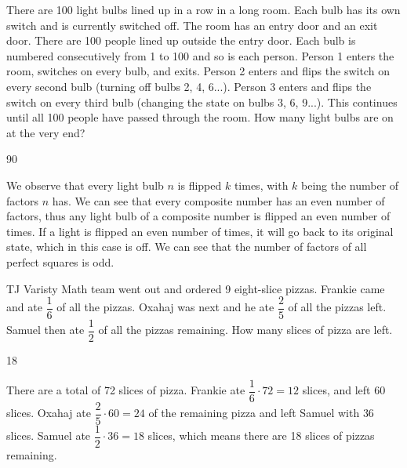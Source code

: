 \documentclass[11pt]{article}
\begin{document}
\begin{problem}
There are 100 light bulbs lined up in a row in a long room. Each bulb has its own switch and is currently switched off. The room has an entry door and an exit door. There are 100 people lined up outside the entry door. Each bulb is numbered consecutively from 1 to 100 and so is each person. Person 1 enters the room, switches on every bulb, and exits. Person 2 enters and flips the switch on every second bulb (turning off bulbs 2, 4, 6...). Person 3 enters and flips the switch on every third bulb (changing the state on bulbs 3, 6, 9...). This continues until all 100 people have passed through the room. How many light bulbs are on at the very end?
\end{problem}

\begin{answer}
90
\end{answer}

\begin{solution} %
We observe that every light bulb $n$ is flipped $k$ times, with $k$ being the number of factors $n$ has. We can see that every composite number has an even number of factors, thus any light bulb of a composite number is flipped an even number of times. If a light is flipped an even number of times, it will go back to its original state, which in this case is off. We can see that the number of factors of all perfect squares is odd. 
\end{solution}


\begin{problem} %
TJ Varisty Math team went out and ordered 9 eight-slice pizzas. Frankie came and ate $\dfrac{1}{6}$ of all the pizzas. Oxahaj was next and he ate $\dfrac{2}{5}$ of all the pizzas left. Samuel then ate $\dfrac{1}{2}$ of all the pizzas remaining. How many slices of pizza are left. 
\end{problem}

\begin{answer}
18
\end{answer}

\begin{solution} %
There are a total of 72 slices of pizza. Frankie ate $\dfrac{1}{6} \cdot 72 = 12$ slices, and left 60 slices. Oxahaj ate $\dfrac{2}{5} \cdot 60 = 24$ of the remaining pizza and left Samuel with $36$ slices. Samuel ate $\dfrac{1}{2} \cdot 36 = 18$ slices, which means there are 18 slices of pizzas remaining. 
\end{solution}
\end{document}
